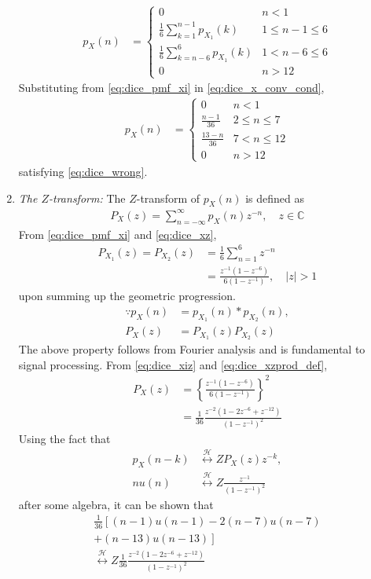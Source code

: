 \documentclass[journal,10pt,twocolumn]{IEEEtran}
\providecommand{\lsbrak}[1]{\ensuremath{{}\left[#1\right.}}
\providecommand{\rsbrak}[1]{\ensuremath{{}\left.#1\right]}}
\providecommand{\brak}[1]{\ensuremath{\left(#1\right)}}
\providecommand{\cbrak}[1]{\ensuremath{\left\{#1\right\}}}
\providecommand{\abs}[1]{\left\vert#1\right\vert}
\providecommand{\system}{\overset{\mathcal{H}}{ \longleftrightarrow}}
\begin{document}
\begin{enumerate}
\begin{align}
p_X(n) &= 
\begin{cases}
0 & n < 1
\\
\frac{1}{6}\sum_{k=1}^{n-1}p_{X_1}(k) &  1 \le n-1 \le  6
\\
\frac{1}{6}\sum_{k=n-6}^{6}p_{X_1}(k) & 1 < n-6 \le 6
\\
0 & n > 12
\end{cases}
\label{eq:dice_x_conv_cond}
\end{align}
Substituting from \eqref{eq:dice_pmf_xi} in \eqref{eq:dice_x_conv_cond},
\begin{align}
p_X(n) &= 
\begin{cases}
0 & n < 1
\\
\frac{n-1}{36} &  2 \le n \le  7
\\
\frac{13-n}{36} & 7 < n \le 12
\\
0 & n > 12
\end{cases}
\label{eq:dice_x_conv_final}
\end{align}
satisfying \eqref{eq:dice_wrong}.
\item {\em The $Z$-transform: }
The $Z$-transform of $p_X(n)$ is defined as 
\begin{align}
P_X(z) = \sum_{n = -\infty}^{\infty}p_X(n)z^{-n}, \quad z \in \mathbb{C}
\label{eq:dice_xz}
\end{align}
%
From \eqref{eq:dice_pmf_xi} and \eqref{eq:dice_xz}, 
\begin{align}
P_{X_1}(z) =P_{X_2}(z) &= \frac{1}{6}\sum_{n = 1}^{6}z^{-n}
\\
&=\frac{z^{-1}\brak{1-z^{-6}}}{6\brak{1-z^{-1}}}, \quad \abs{z} > 1
\label{eq:dice_xiz}
\end{align}
upon summing up the geometric progression.  
\begin{align}
\because p_X(n) &= p_{X_1}(n)*p_{X_2}(n),
\\
P_X(z) &= P_{X_1}(z)P_{X_2}(z)
\label{eq:dice_xzprod_def}
\end{align}
The above property follows from Fourier analysis and is fundamental to signal processing. 
From \eqref{eq:dice_xiz} and \eqref{eq:dice_xzprod_def},
\begin{align}
P_X(z) &= \cbrak{\frac{z^{-1}\brak{1-z^{-6}}}{6\brak{1-z^{-1}}}}^2
\\
&= \frac{1}{36}\frac{z^{-2}\brak{1-2z^{-6}+z^{-12}}}{\brak{1-z^{-1}}^2}
\label{eq:dice_xzprod}
\end{align}
Using the fact that 
\begin{align}
p_X(n-k) &\system{Z}P_X(z)z^{-k},
\\
nu(n)&\system{Z} \frac{z^{-1}}{\brak{1-z^{-1}}^2}
\end{align}
after some algebra, it can be shown that
\begin{multline}
\frac{1}{36}\lsbrak{\brak{n-1}u(n-1) - 2 \brak{n-7}u(n-7)}
\\
\rsbrak{ +\brak{n-13}u(n-13)}
\\
\system{Z}
\frac{1}{36}\frac{z^{-2}\brak{1-2z^{-6}+z^{-12}}}{\brak{1-z^{-1}}^2}
\label{eq:dice_xz_closed}
\end{multline}


\end{enumerate}
\end{document}

